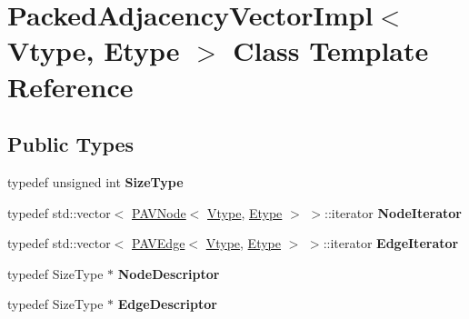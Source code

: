 \hypertarget{class_packed_adjacency_vector_impl}{
\section{PackedAdjacencyVectorImpl$<$ Vtype, Etype $>$ Class Template Reference}
\label{class_packed_adjacency_vector_impl}
}
\subsection*{Public Types}
\begin{DoxyCompactItemize}
\item 
\hypertarget{class_packed_adjacency_vector_impl_af8e8384d80ee22887d846863db530ae4}{
typedef unsigned int {\bfseries SizeType}}
\label{class_packed_adjacency_vector_impl_af8e8384d80ee22887d846863db530ae4}

\item 
\hypertarget{class_packed_adjacency_vector_impl_ab0feb6b2198e48ec324d428f69622480}{
typedef std::vector$<$ \hyperlink{class_p_a_v_node}{PAVNode}$<$ \hyperlink{class_vtype}{Vtype}, \hyperlink{class_etype}{Etype} $>$ $>$::iterator {\bfseries NodeIterator}}
\label{class_packed_adjacency_vector_impl_ab0feb6b2198e48ec324d428f69622480}

\item 
\hypertarget{class_packed_adjacency_vector_impl_ac52fee9554bd7f812d4adb7fe47b7818}{
typedef std::vector$<$ \hyperlink{class_p_a_v_edge}{PAVEdge}$<$ \hyperlink{class_vtype}{Vtype}, \hyperlink{class_etype}{Etype} $>$ $>$::iterator {\bfseries EdgeIterator}}
\label{class_packed_adjacency_vector_impl_ac52fee9554bd7f812d4adb7fe47b7818}

\item 
\hypertarget{class_packed_adjacency_vector_impl_ad2545aa75362635c9a0829d9ab237a99}{
typedef SizeType $\ast$ {\bfseries NodeDescriptor}}
\label{class_packed_adjacency_vector_impl_ad2545aa75362635c9a0829d9ab237a99}

\item 
\hypertarget{class_packed_adjacency_vector_impl_a26ae4d6227d945afa207144a53d3b3c1}{
typedef SizeType $\ast$ {\bfseries EdgeDescriptor}}
\label{class_packed_adjacency_vector_impl_a26ae4d6227d945afa207144a53d3b3c1}

\end{DoxyCompactItemize}

